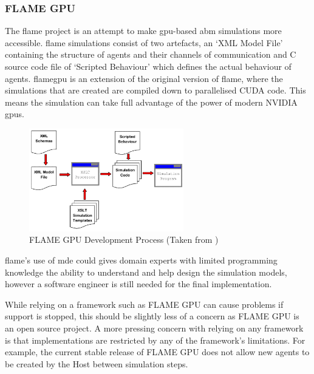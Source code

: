 \documentclass{UoYCSproject}
\begin{document}
\subsubsection{\gls{FLAME GPU}}
The \gls{flame} project is an attempt to make \gls{gpu}-based \gls{abm} simulations more accessible.
\gls{flame} simulations consist of two artefacts, an `XML Model File' containing the structure of agents and their channels of communication and C source code file of `Scripted Behaviour' which defines the actual behaviour of agents.
\acrfull{flamegpu} is an extension of the original version of \acrshort{flame}, where the simulations that are created are compiled down to parallelised CUDA code.
This means the simulation can take full advantage of the power of modern NVIDIA \acrshort{gpu}s.

\begin{figure}[htp]
\centering
\includegraphics[width=0.6\textwidth]{Appendix/FLAME_Process}
\caption{\gls{FLAME GPU} Development Process (Taken from \cite{flame_simulation})}
\label{fig:flame_dev}
\end{figure}

\gls{flame}'s use of \gls{mde} could gives domain experts with limited programming knowledge the ability to understand and help design the simulation models, however a software engineer is still needed for the final implementation.




While relying on a framework such as \gls{FLAME GPU} can cause problems if support is stopped, this should be slightly less of a concern as \gls{FLAME GPU} is an open source project.
A more pressing concern with relying on any framework is that implementations are restricted by any of the framework's limitations.
For example, the current stable release of \gls{FLAME GPU} does not allow new agents to be created by the \gls{Host} between simulation steps.
\end{document}

